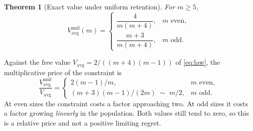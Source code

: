 \documentclass[conference]{IEEEtran}
\newtheorem{theorem}{Theorem}
\theoremstyle{definition}
\begin{document}
\begin{theorem}[Exact value under uniform retention]
\label{thm:unifretention}
For $m\ge5$,
\begin{equation}
V^{\mathrm{unif}}_{\mathrm{avg}}(m)=
\begin{cases}
\dfrac{4}{m(m+4)}, & m\text{ even},\\[6pt]
\dfrac{m+3}{m(m+4)}, & m\text{ odd}.
\end{cases}
\label{eq:unifretention}
\end{equation}
\end{theorem}

Against the free value $V_{\mathrm{avg}}=2/((m+4)(m-1))$ of \eqref{eq:law}, the multiplicative
price of the constraint is
\begin{equation}
\frac{V^{\mathrm{unif}}_{\mathrm{avg}}}{V_{\mathrm{avg}}}
=\begin{cases}
2(m-1)/m, & m\text{ even},\\[4pt]
(m+3)(m-1)/(2m)\;\sim\;m/2, & m\text{ odd}.
\end{cases}
\label{eq:unifprice}
\end{equation}
At even sizes the constraint costs a factor approaching two. At odd sizes it costs a factor
growing \emph{linearly} in the population. Both values still tend to zero, so this is a
relative price and not a positive limiting regret.
\end{document}
